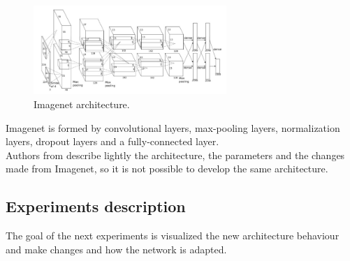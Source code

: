 \begin{figure}[htb]
\centering
\includegraphics[width=0.65\textwidth]{images_miscelaneus/Imagenet.png}
\caption{Imagenet architecture.} \label{fig:Imagenet_architecture}
\end{figure}

Imagenet is formed by convolutional layers, max-pooling layers, normalization layers, dropout layers and a fully-connected layer.\\

Authors from \cite{yangLL14} describe lightly the architecture, the parameters and the changes made from Imagenet, so it is not possible to develop the same architecture.\\



\subsection{Experiments description} %
The goal of the next experiments is visualized the new architecture behaviour and make changes and how the network is adapted.\\

